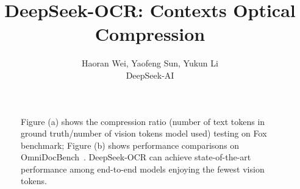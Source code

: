 \documentclass[11pt, a4paper, logo, copyright, nonumbering]{deepseek}
\title{\centering DeepSeek-OCR: Contexts Optical Compression}
\author{Haoran Wei, Yaofeng Sun, Yukun Li\\
\small DeepSeek-AI\\
}
\begin{document}
\begin{CJK*}{UTF8}{gbsn}

\maketitle

\begin{figure}[h]
    \centering
    \caption{Figure (a) shows the compression ratio (number of text tokens in ground truth/number of vision tokens model used) testing on Fox~\cite{liu2024focus_fox} benchmark; Figure (b) shows performance comparisons on OmniDocBench~\cite{ouyang2025omnidocbench}. DeepSeek-OCR can achieve state-of-the-art performance among end-to-end models enjoying the fewest vision tokens.}
    \label{fig:1}
\end{figure}

\newpage

\begin{spacing}{0.9}
\tableofcontents
\end{spacing}



\newpage


\end{CJK*}
\end{document}
